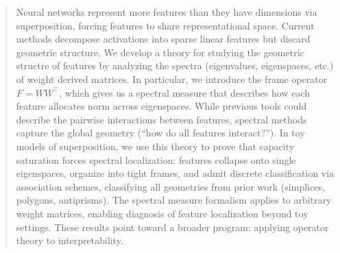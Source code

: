 \documentclass{article}
\theoremstyle{plain}
\numberwithin{equation}{section}
\theoremstyle{definition}
\theoremstyle{remark}
\begin{document}
\begin{abstract}


Neural networks represent more features than they have dimensions via superposition, forcing features to share representational space. Current methods decompose activations into sparse linear features but discard geometric structure. We develop a theory for studying the geometric structre of features by analyzing the spectra (eigenvalues, eigenspaces, etc.) of weight derived matrices. In particular, we introduce the frame operator $F = WW^\top$, which gives us a spectral measure that describes how each feature allocates norm across eigenspaces. While previous tools could describe the pairwise interactions between features, spectral methods capture the global geometry (``how do all features interact?'').
In toy models of superposition, we use this theory to prove that capacity saturation forces spectral localization: features collapse onto single eigenspaces, organize into tight frames, and admit discrete classification via association schemes, classifying all geometries from prior work (simplices, polygons, antiprisms).
The spectral measure formalism applies to arbitrary weight matrices, enabling diagnosis of feature localization beyond toy settings. These results point toward a broader program: applying operator theory to interpretability.

\iffalse


\end{abstract}
\end{document}
